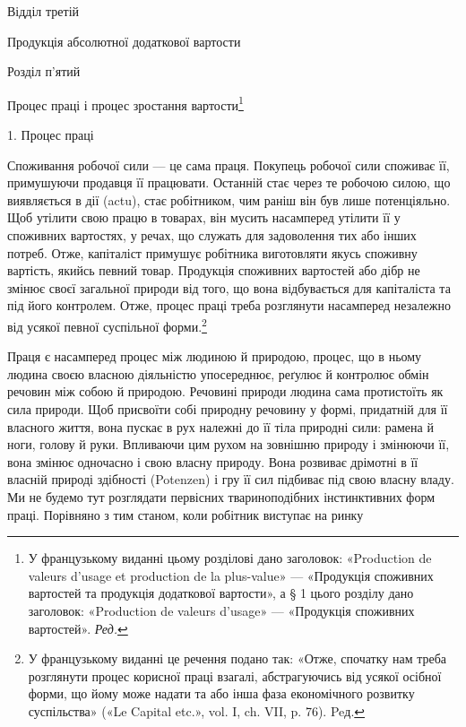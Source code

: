 Відділ третій

Продукція абсолютної додаткової вартости

Розділ п’ятий

Процес праці і процес зростання вартости\footnote*{
У французькому виданні цьому розділові дано заголовок: «Production
de valeurs d’usage et production de la plus-value» — «Продукція
споживних вартостей та продукція додаткової вартости», а § 1 цього розділу
дано заголовок: «Production de valeurs d’usage» — «Продукція споживних
вартостей». \emph{Ред.}
}

1. Процес праці

Споживання робочої сили — це сама праця. Покупець робочої
сили споживає її, примушуючи продавця її працювати. Останній
стає через те робочою силою, що виявляється в дії (actu),
стає робітником, чим раніш він був лише потенціяльно. Щоб
утілити свою працю в товарах, він мусить насамперед утілити
її у споживних вартостях, у речах, що служать для задоволення
тих або інших потреб. Отже, капіталіст примушує робітника
виготовляти якусь споживну вартість, якийсь певний товар.
Продукція споживних вартостей або дібр не змінює своєї загальної
природи від того, що вона відбувається для капіталіста та
під його контролем. Отже, процес праці треба розглянути насамперед
незалежно від усякої певної суспільної форми.\footnote*{
У французькому виданні це речення подано так: «Отже, спочатку
нам треба розглянути процес корисної праці взагалі, абстрагуючись
від усякої осібної форми, що йому може надати та або інша фаза економічного
розвитку суспільства» («Le Capital etc.», vol. I, ch. VII, p. 76). Peд.
}

Праця є насамперед процес між людиною й природою, процес,
що в ньому людина своєю власною діяльністю упосереднює, реґулює
й контролює обмін речовин між собою й природою. Речовині
природи людина сама протистоїть як сила природи. Щоб
присвоїти собі природну речовину у формі, придатній для її власного
життя, вона пускає в рух належні до її тіла природні сили:
рамена й ноги, голову й руки. Впливаючи цим рухом на зовнішню
природу і змінюючи її, вона змінює одночасно і свою власну природу.
Вона розвиває дрімотні в її власній природі здібності (Potenzen)
і гру її сил підбиває під свою власну владу. Ми не будемо
тут розглядати первісних твариноподібних інстинктивних форм
праці. Порівняно з тим станом, коли робітник виступає на ринку